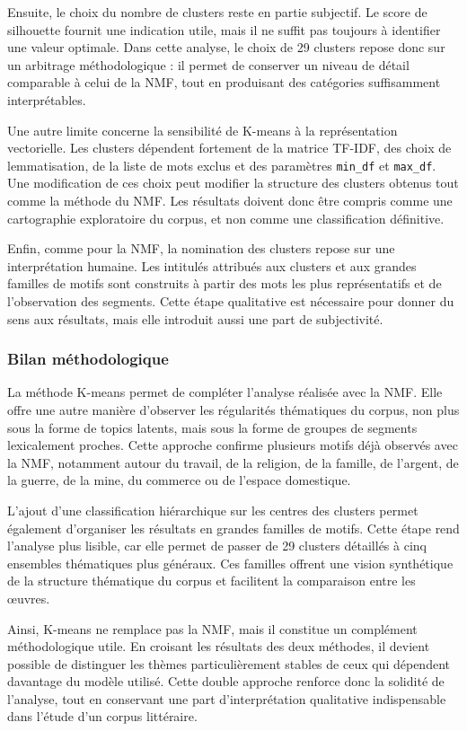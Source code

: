\documentclass{article}
\begin{document}
Ensuite, le choix du nombre de clusters reste en partie subjectif. Le score de silhouette fournit une indication utile, mais il ne suffit pas toujours à identifier une valeur optimale. Dans cette analyse, le choix de 29 clusters repose donc sur un arbitrage méthodologique : il permet de conserver un niveau de détail comparable à celui de la NMF, tout en produisant des catégories suffisamment interprétables.

Une autre limite concerne la sensibilité de K-means à la représentation vectorielle. Les clusters dépendent fortement de la matrice TF-IDF, des choix de lemmatisation, de la liste de mots exclus et des paramètres \texttt{min\_df} et \texttt{max\_df}. Une modification de ces choix peut modifier la structure des clusters obtenus tout comme la méthode du NMF. Les résultats doivent donc être compris comme une cartographie exploratoire du corpus, et non comme une classification définitive.

Enfin, comme pour la NMF, la nomination des clusters repose sur une interprétation humaine. Les intitulés attribués aux clusters et aux grandes familles de motifs sont construits à partir des mots les plus représentatifs et de l'observation des segments. Cette étape qualitative est nécessaire pour donner du sens aux résultats, mais elle introduit aussi une part de subjectivité.

\subsubsection{Bilan méthodologique}

La méthode K-means permet de compléter l'analyse réalisée avec la NMF. Elle offre une autre manière d'observer les régularités thématiques du corpus, non plus sous la forme de topics latents, mais sous la forme de groupes de segments lexicalement proches. Cette approche confirme plusieurs motifs déjà observés avec la NMF, notamment autour du travail, de la religion, de la famille, de l'argent, de la guerre, de la mine, du commerce ou de l'espace domestique.

L'ajout d'une classification hiérarchique sur les centres des clusters permet également d'organiser les résultats en grandes familles de motifs. Cette étape rend l'analyse plus lisible, car elle permet de passer de 29 clusters détaillés à cinq ensembles thématiques plus généraux. Ces familles offrent une vision synthétique de la structure thématique du corpus et facilitent la comparaison entre les œuvres.

Ainsi, K-means ne remplace pas la NMF, mais il constitue un complément méthodologique utile. En croisant les résultats des deux méthodes, il devient possible de distinguer les thèmes particulièrement stables de ceux qui dépendent davantage du modèle utilisé. Cette double approche renforce donc la solidité de l'analyse, tout en conservant une part d'interprétation qualitative indispensable dans l'étude d'un corpus littéraire.
\end{document}
